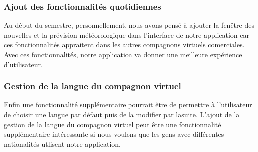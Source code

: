 \subsubsection{Ajout des fonctionnalités quotidiennes}
\indent Au début du semestre, personnellement, nous avons pensé à ajouter la fenêtre des nouvelles et la prévision météorologique dans l'interface de notre application car ces fonctionnalités appraitent dans les autres compagnons virtuels comerciales. Avec ces fonctionnalités, notre application va donner une meilleure expérience d'utilisateur.

\subsubsection{Gestion de la langue du compagnon virtuel}
\indent Enfin une fonctionnalité supplémentaire pourrait être de permettre à l'utilisateur de choisir une langue par défaut puis de la modifier par lasuite. L'ajout de la gestion de la langue du compagnon virtuel peut être une fonctionnalité supplémentaire intéressante si nous voulons que les gens avec différentes nationalités utlisent notre application.